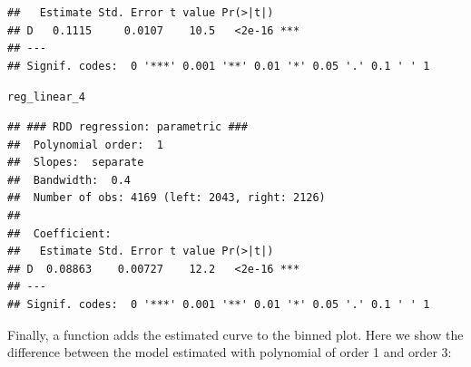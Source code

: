 \documentclass[english,nojss]{jss}\usepackage{graphicx, color}
\makeatletter
\newenvironment{kframe}{%
 \def\at@end@of@kframe{}%
 \ifinner\ifhmode%
  \def\at@end@of@kframe{\end{minipage}}%
  \begin{minipage}{\columnwidth}%
 \fi\fi%
 \def\FrameCommand##1{\hskip\@totalleftmargin \hskip-\fboxsep
 \colorbox{shadecolor}{##1}\hskip-\fboxsep
     \hskip-\linewidth \hskip-\@totalleftmargin \hskip\columnwidth}%
 \MakeFramed {\advance\hsize-\width
   \@totalleftmargin\z@ \linewidth\hsize
   \@setminipage}}%
 {\par\unskip\endMakeFramed%
 \at@end@of@kframe}
\newenvironment{knitrout}{}{} %
\makeatother
\begin{document}
\begin{knitrout}
\begin{kframe}
\begin{verbatim}
##   Estimate Std. Error t value Pr(>|t|)    
## D   0.1115     0.0107    10.5   <2e-16 ***
## ---
## Signif. codes:  0 '***' 0.001 '**' 0.01 '*' 0.05 '.' 0.1 ' ' 1
\end{verbatim}
\begin{alltt}
reg_linear_4
\end{alltt}
\begin{verbatim}
## ### RDD regression: parametric ###
## 	Polynomial order:  1 
## 	Slopes:  separate 
## 	Bandwidth:  0.4 
## 	Number of obs: 4169 (left: 2043, right: 2126)
## 
## 	Coefficient:
##   Estimate Std. Error t value Pr(>|t|)    
## D  0.08863    0.00727    12.2   <2e-16 ***
## ---
## Signif. codes:  0 '***' 0.001 '**' 0.01 '*' 0.05 '.' 0.1 ' ' 1
\end{verbatim}
\end{kframe}
\end{knitrout}


Finally, a  function adds the estimated curve to the
binned plot. Here we show the difference between the model estimated
with polynomial of order 1 and order 3:
\end{document}
